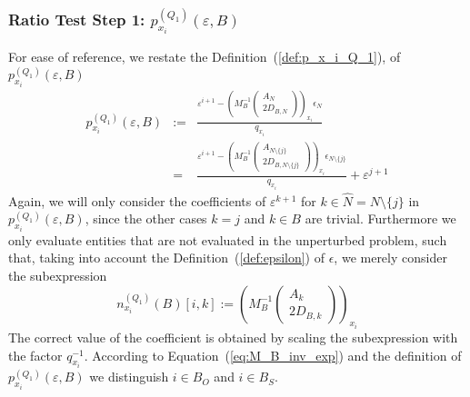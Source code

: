 \documentclass[a4paper]{article}
\newcommand{\px}[3]{\ensuremath{p_{x_{#1}}^{(#2)}(\varepsilon, #3)}}
\begin{document}
\subsubsection{Ratio Test Step 1:
$\px{i}{Q_{1}}{B}$}
For ease of reference, we restate the Definition~(\ref{def:p_x_i_Q_1}),
of $p_{x_{i}}^{(Q_{1})}(\varepsilon, B)$
\begin{eqnarray*}
p_{x_{i}}^{(Q_{1})}\left(\varepsilon, B\right) &:=&
  \frac{\varepsilon^{i+1} -
         \left(M_{B}^{-1}
           \left(\begin{array}{c}
                    A_{N}  \\
	            \hline
	            2D_{B, N}
	         \end{array}
	   \right)
         \right)_{x_{i}}\epsilon_{N}}{q_{x_{i}}}
\\
&=&
\frac{\varepsilon^{i+1} -
         \left(M_{B}^{-1}
           \left(\begin{array}{c}
                    A_{N \setminus \{j\}}  \\
	            \hline
	            2D_{B, N \setminus \{j\}}
	         \end{array}
	   \right)
         \right)_{x_{i}}\epsilon_{N \setminus \{j\}}}{q_{x_{i}}}
+ \varepsilon^{j+1}
\end{eqnarray*}
Again, we will only consider the coefficients of
$\varepsilon^{k+1}$ for $k \in \hat{N}= N \setminus \{j\}$ in
$p_{x_{i}}^{(Q_{1})}(\varepsilon, B)$, since the other cases $k=j$ and $k \in B$
are trivial. Furthermore we only evaluate entities that are not evaluated in the
unperturbed problem, such that, taking into account the
Definition~(\ref{def:epsilon}) of $\epsilon$, we merely consider
the subexpression
\begin{equation}
\label{def:n_x_i_Q_1}
n_{x_{i}}^{(Q_{1})}(B)[i,k]:=
\left(M_{B}^{-1}
           \left(\begin{array}{c}
                    A_{k}  \\
	            \hline
	            2D_{B,k}
	         \end{array}
	   \right)
         \right)_{x_{i}}
\end{equation}
The correct value of the coefficient is obtained by scaling the subexpression
with the factor $q_{x_{i}}^{-1}$.
According to Equation~(\ref{eq:M_B_inv_exp}) and the definition of
$p_{x_{i}}^{(Q_{1})}(\varepsilon, B)$ we distinguish $i \in B_{O}$ and
$i \in B_{S}$.
\end{document}
